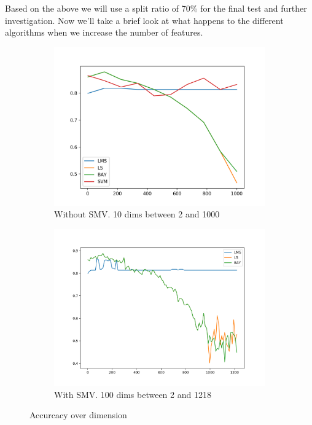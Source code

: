 \documentclass[12pt, a4paper]{article}
\begin{document}
Based on the above we will use a split ratio of 70\% for the final test and further investigation. Now we'll take a brief look at what happens to the different algorithms when we increase the number of features. 
\begin{figure}[H]
    \centering
    \begin{subfigure}{0.45\textwidth}
        \includegraphics[width=\textwidth]{recursos/1/class_vs}
        \caption{ Without SMV. 10 dims between 2 and 1000}
    \end{subfigure}
    \begin{subfigure}{0.45\textwidth}
        \includegraphics[width=\textwidth]{recursos/1/class_vs_simple}
        \caption{With SMV. 100 dims between 2 and 1218 }
    \end{subfigure}
     \caption{Accurcacy over dimension}
\end{figure}
\end{document}
